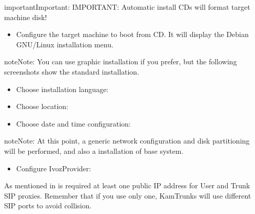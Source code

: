 \documentclass[letterpaper,10pt,english]{sphinxmanual}
\begin{document}
\begin{notice}{important}{Important:}
IMPORTANT: Automatic install CDs will format target machine disk!
\end{notice}
\begin{itemize}
\item {} 
Configure the target machine to boot from CD. It will display the Debian
GNU/Linux installation menu.

\end{itemize}

\begin{notice}{note}{Note:}
You can use graphic installation if you prefer, but the following
screenshots show the standard installation.
\end{notice}

\noindent{}
\begin{itemize}
\item {} 
Choose installation language:

\end{itemize}

\noindent{}
\begin{itemize}
\item {} 
Choose location:

\end{itemize}

\noindent{}
\begin{itemize}
\item {} 
Choose date and time configuration:

\end{itemize}

\noindent{}

\begin{notice}{note}{Note:}
At this point, a generic network configuration and disk partitioning
will be performed, and also a installation of base system.
\end{notice}
\begin{itemize}
\item {} 
Configure IvozProvider:

\end{itemize}

\noindent{}

As mentioned in {\hyperref[basics/installation/requirements:minimum\string-requirements]{}} is required at least one public IP
address for User and Trunk SIP proxies. Remember that if you use only one,
KamTrunks will use different SIP ports to avoid collision.
\end{document}
